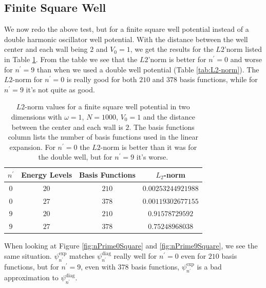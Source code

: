 \documentclass[../main.tex]{subfiles}
\begin{document}
\subsection{Finite Square Well}
We now redo the above test, but for a finite square well potential instead of a double harmonic oscillator well potential. With the distance between the well center and each wall being $2$ and $V_0 = 1$, we get the results for the $L2$'norm listed in Table \ref{tab:L2-norm Square}. From the table we see that the $L2$'norm is better for $n^\prime = 0$ and worse for $n^\prime = 9$ than when we used a double well potential (Table \ref{tab:L2-norm}). The $L2$-norm for $n^\prime = 0$ is really good for both $210$ and $378$ basis functions, while for $n^\prime = 9$ it's not quite as good.
\begin{table}[!ht]
  \centering
  \begin{tabular}{ | c | c | c | c | }
    \hline
    $n^\prime$ & Energy Levels & Basis Functions & $L_2$-norm\\*
    \hline
    $0$ & $20$ & $210$ & $0.00253244921988$
    \\*
    \hline
    $0$ & $27$ & $378$ & $0.00119302677155$
    \\*
    \hline
    $9$ & $20$ & $210$ & $0.91578729592$
    \\*
    \hline
    $9$ & $27$ & $378$ & $0.75248968038$
    \\*
    \hline
  \end{tabular}
  \caption{$L2$-norm values for a finite square well potential in two dimensions with $\omega = 1$, $N = 1000$, $V_0 = 1$ and the distance between the center and each wall is $2$. The basis functions column lists the number of basis functions used in the linear expansion. For $n^\prime = 0$ the $L2$-norm is better than it was for the double well, but for $n^\prime = 9$ it's worse.}
  \label{tab:L2-norm Square}
\end{table}

When looking at Figure \ref{fig:nPrime0Square} and \ref{fig:nPrime9Square}, we see the same situation. $\psi_{n^\prime}^\textrm{exp}$ matches $\psi_{n^\prime}^\textrm{diag}$ really well for $n^\prime = 0$ even for $210$ basis functions, but for $n^\prime = 9$, even with $378$ basis functions, $\psi_{n^\prime}^\textrm{exp}$ is a bad approximation to $\psi_{n^\prime}^\textrm{diag}$.
\end{document}
